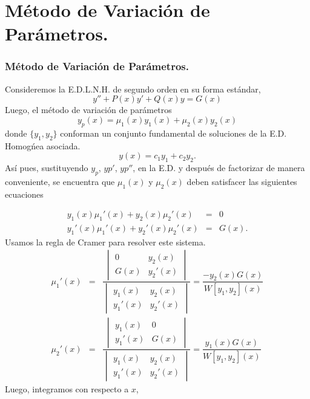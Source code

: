 \documentclass[9pt]{beamer}
\begin{document}

\section{Método de Variación de Parámetros.} %
\begin{frame}[t]
	\frametitle{Método de Variación de Parámetros.}
	\begin{block}{}
		Consideremos la E.D.L.N.H. de segundo orden en su forma estándar,
		\[
			y'' + P(x) y' +Q(x) y = G(x)
		\]
		Luego, el método de variación de parámetros
		\[
			y_p(x) = \mu _1(x) y_1(x) + \mu _2(x) y_2(x)
		\]
		donde \(\{y_1,y_2\}\) conforman un conjunto fundamental de soluciones de la E.D. Homogńea asociada.
		\[
			y(x) = c_1y_1 + c_2y_2.
		\]
		Así pues, sustituyendo \(y_p\), \(yp'\), \(yp''\), en la E.D. y después de factorizar de manera conveniente, se encuentra que \(\mu _1(x)\) y \(\mu _2(x)\) deben satisfacer las siguientes ecuaciones
	\end{block}
\end{frame}

\begin{frame}[t]
	\begin{block}{}
		\[
			\begin{array}{rcl}
				y_1(x) \mu _1' (x) +y_2(x) \mu _2' (x) & = & 0 \\[2mm]
				y_1' (x) \mu _1' (x) + y_2'(x) \mu _2' (x) & = & G(x) .
			\end{array}
		\]
		Usamos la regla de Cramer para resolver este sistema.
		\[
			\begin{array}{rcl}
				\mu_1 '(x) & = & \dfrac{\begin{vmatrix}
					0 & y_2(x) \\
					G(x) & y_2'(x)
				\end{vmatrix}}{\begin{vmatrix}
					y_1(x) & y_2(x) \\
					y_1' (x) & y_2' (x)
				\end{vmatrix}} = \dfrac{-y_2(x) G(x)}{W[y_1,y_2] (x)} \\[1cm]
				\mu_2 '(x) & = & \dfrac{\begin{vmatrix}
					y_1(x) & 0 \\
					y_1'(x) & G(x)
				\end{vmatrix}}{\begin{vmatrix}
					y_1(x) & y_2(x) \\
					y_1' (x) & y_2' (x)
				\end{vmatrix}} = \dfrac{y_1(x) G(x)}{W[y_1,y_2] (x)}
			\end{array}
		\]
		Luego, integramos con respecto a \(x\),
	\end{block}
\end{frame}
\end{document}
